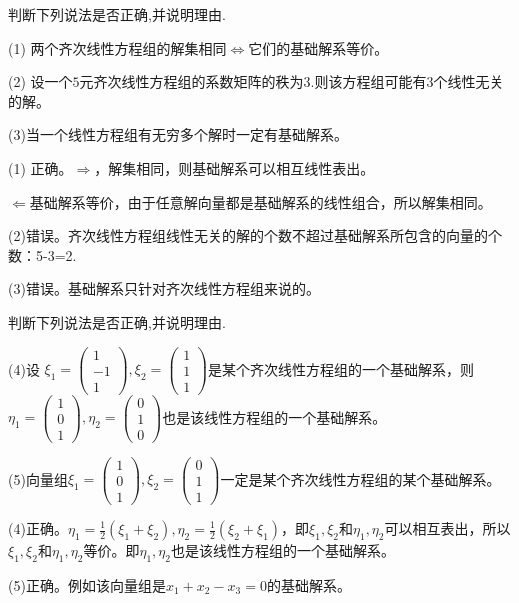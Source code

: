 \documentclass[a4paper]{report}
\begin{document}
\EX 判断下列说法是否正确,并说明理由.

(1) 两个齐次线性方程组的解集相同$\Leftrightarrow$它们的基础解系等价。

(2) 设一个$5$元齐次线性方程组的系数矩阵的秩为$3$.则该方程组可能有$3$个线性无关的解。

(3)当一个线性方程组有无穷多个解时一定有基础解系。

\begin{jie}
(1) 正确。$\Rightarrow$，解集相同，则基础解系可以相互线性表出。

$\Leftarrow$基础解系等价，由于任意解向量都是基础解系的线性组合，所以解集相同。

(2)错误。齐次线性方程组线性无关的解的个数不超过基础解系所包含的向量的个数：5-3=2.

(3)错误。基础解系只针对齐次线性方程组来说的。
\end{jie}

\EX 判断下列说法是否正确,并说明理由.

(4)设
$
\xi_1=
\begin{pmatrix}
1\\-1 \\1
\end{pmatrix},\xi_2=
\begin{pmatrix}
1\\1 \\1
\end{pmatrix}
$是某个齐次线性方程组的一个基础解系，则$
\eta_1=
\begin{pmatrix}
1\\0 \\1
\end{pmatrix},\eta_2=
\begin{pmatrix}
0\\1 \\0
\end{pmatrix}
$也是该线性方程组的一个基础解系。

(5)向量组$
\xi_1=\begin{pmatrix}
1\\0 \\1
\end{pmatrix},\xi_2=
\begin{pmatrix}
0\\1 \\1
\end{pmatrix}
$一定是某个齐次线性方程组的某个基础解系。

\begin{jie}
(4)正确。$\eta_1=\frac{1}{2}(\xi_1+\xi_2),\eta_2=\frac{1}{2}(\xi_2+\xi_1)$，即$\xi_1,\xi_2$和$\eta_1,\eta_2$可以相互表出，所以$\xi_1,\xi_2$和$\eta_1,\eta_2$等价。即$\eta_1,\eta_2$也是该线性方程组的一个基础解系。

(5)正确。例如该向量组是$x_1+x_2-x_3=0$的基础解系。
\end{jie}
\end{document}
